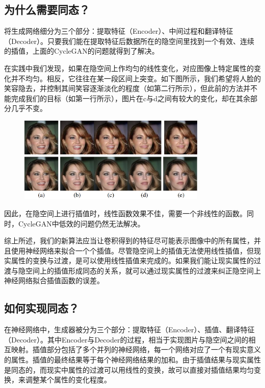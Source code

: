 \documentclass[UTF8,a4paper，12pt]{article}
\theoremstyle{theorem}
\theoremstyle{definition}
\begin{document}
\subsection{为什么需要同态？}

将生成网络细分为三个部分：提取特征（Encoder）、中间过程和翻译特征（Decoder）。只要我们能在提取特征后数据所在的隐空间里找到一个有效、连续的插值，上面的CycleGAN的问题就得到了解决。

在实践中我们发现，如果在隐空间上作均匀的线性变化，对应图像上特定属性的变化并不均匀。相反，它往往在某一段区间上突变。如下图所示，我们希望将人脸的笑容隐去，并控制其间笑容逐渐淡化的程度（如第二行所示），但此前的方法并不能完成我们的目标（如第一行所示），图片在c与d之间有较大的变化，却在其余部分几乎不变。

\begin{figure}[htbp]
	\centering
	\includegraphics[width=0.8\textwidth]{assets/11}
	\caption{}
\end{figure}
因此，在隐空间上进行插值时，线性函数效果不佳，需要一个非线性的函数。同时，CycleGAN中低效的问题仍然无法解决。

综上所述，我们的新算法应当让卷积得到的特征尽可能表示图像中的所有属性，并且使用神经网络来拟合一个个插值。尽管隐空间上的插值无法使用线性插值，但现实属性的变换与过渡，是可以使用线性插值来完成的。如果我们能让现实属性的过渡与隐空间上的插值形成同态的关系，就可以通过现实属性的过渡来纠正隐空间上神经网络拟合插值函数的误差。

\subsection{如何实现同态？}

在神经网络中，生成器被分为三个部分：提取特征（Encoder）、插值、翻译特征（Decoder）。其中Encoder与Decoder的过程，相当于实现图片与隐空间之间的相互映射。插值部分包括了多个并列的神经网络，每一个网络对应了一个有现实意义的属性。插值的最终结果等于每个神经网络结果的加和。由于插值结果与现实属性是同态的，而现实中属性的过渡可以用线性的变换，故可以直接对插值结果均匀变换，来调整某个属性的变化程度。
\end{document}
